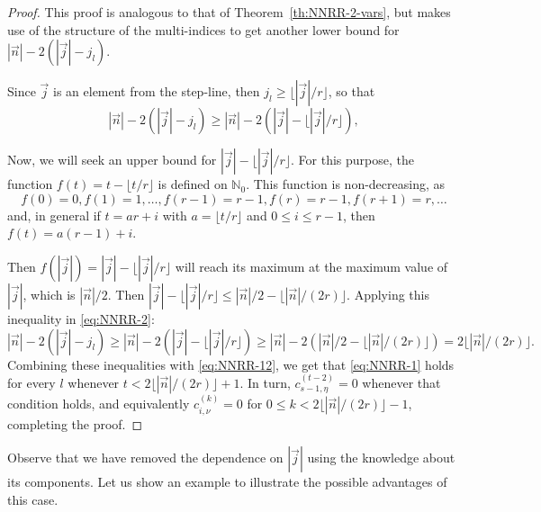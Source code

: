 \documentclass[a4paper]{article}
\theoremstyle{plain}
\theoremstyle{definition}
\begin{document}
    \begin{proof}
        This proof is analogous to that of Theorem~\ref{th:NNRR-2-vars}, but makes use of the structure of the multi-indices to get another lower bound for $|\vec n|-2(|\vec j|-j_l)$.

        Since $\vec j$ is an element from the step-line, then $j_l\geq \lfloor|\vec j|/r\rfloor$, so that
        \begin{equation}
            \label{eq:NNRR-2}
            |\vec n|-2(|\vec j|-j_l)\geq |\vec n| -2(|\vec j|-\lfloor|\vec j|/r\rfloor),
        \end{equation}

        Now, we will seek an upper bound for $|\vec j|-\lfloor|\vec j|/r\rfloor$. For this purpose, the  function $f(t)=t-\lfloor t/r\rfloor$ is defined on $\mathbb N_0$. This function is non-decreasing, as
        $$
        f(0)=0, f(1)=1,\dots, f(r-1)=r-1,f(r)=r-1, f(r+1)=r,\dots
        $$
        and, in general if $t=ar+i$ with $a=\lfloor t/r\rfloor$ and $0\leq i\leq r-1$, then $f(t)=a(r-1)+i$. 
        

        Then $f(|\vec j|)=|\vec j|-\lfloor|\vec j|/r\rfloor$ will reach its maximum at the maximum value of $|\vec j|$, which is $|\vec n|/2$. Then $|\vec j|-\lfloor |\vec j|/r\rfloor \leq |\vec n|/2- \lfloor |\vec n|/(2r)\rfloor$. Applying this inequality in \eqref{eq:NNRR-2}:
        $$
        |\vec n|-2(|\vec j|-j_l)\geq |\vec n| -2(|\vec j|-\lfloor|\vec j|/r\rfloor)\geq |\vec n| -2( |\vec n|/2- \lfloor |\vec n|/(2r)\rfloor)=2\lfloor |\vec n|/(2r)\rfloor.
        $$
        Combining these inequalities with \eqref{eq:NNRR-12}, we get that \eqref{eq:NNRR-1} holds for every $l$ whenever $t< 2\lfloor |\vec n|/(2r)\rfloor+1$. In turn, $c^{(t-2)}_{s-1,\eta}=0$ whenever that condition holds, and equivalently $c^{(k)}_{i,\nu} =0$ for $0\leq k < 2\lfloor |\vec n|/(2r)\rfloor-1$, completing the proof.
    \end{proof}    

    Observe that we have removed the dependence on $|\vec j|$ using the knowledge about its components. Let us show an example to illustrate the possible advantages of this case.
\end{document}
